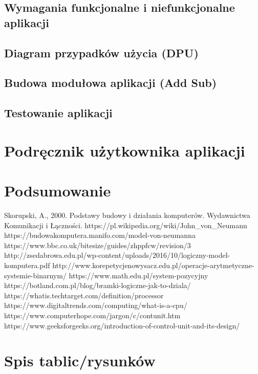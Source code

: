 \documentclass[12pt, a4paper, onside, polish]{article}				%
\begin{document}
\subsection{Wymagania funkcjonalne i niefunkcjonalne aplikacji}
\cleardoublepage

\subsection{Diagram przypadków użycia (DPU)}
\cleardoublepage

\subsection{Budowa modułowa aplikacji (Add Sub)}
\cleardoublepage

\subsection{Testowanie aplikacji}
\cleardoublepage



\section{Podręcznik użytkownika aplikacji}
\cleardoublepage




\section{Podsumowanie}
\cleardoublepage



\begin{thebibliography}{100}
 Skorupski, A., 2000. Podstawy budowy i działania komputerów. Wydawnictwa Komunikacji i Łączności.
\bibitem{} https://pl.wikipedia.org/wiki/John_von_Neumann 
\bibitem{} https://budowakomputera.manifo.com/model-von-neumanna 
\bibitem{} https://www.bbc.co.uk/bitesize/guides/zhppfcw/revision/3 
\bibitem{} http://zsedabrowa.edu.pl/wp-content/uploads/2016/10/logiczny-model-komputera.pdf 
\bibitem{} http://www.korepetycjenowysacz.edu.pl/operacje-arytmetyczne-systemie-binarnym/
\bibitem{} https://www.math.edu.pl/system-pozycyjny
\bibitem{} https://botland.com.pl/blog/bramki-logiczne-jak-to-dziala/
\bibitem{} https://whatis.techtarget.com/definition/processor
\bibitem{} https://www.digitaltrends.com/computing/what-is-a-cpu/
\bibitem{} https://www.computerhope.com/jargon/c/contunit.htm
\bibitem{} https://www.geeksforgeeks.org/introduction-of-control-unit-and-its-design/

\end{thebibliography}


\cleardoublepage
\section{Spis tablic/rysunków}
\begin{appendix}
\listoftables
\listoffigures
\end{appendix}

\cleardoublepage
\end{document}
